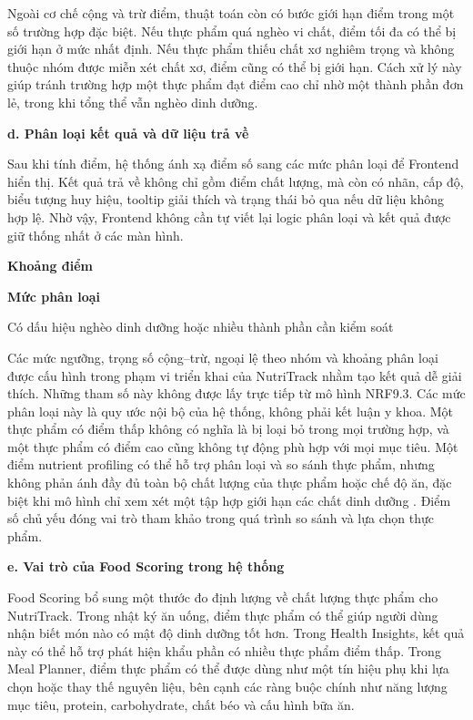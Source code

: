 \documentclass[12pt, a4paper]{report}
\begin{document}
Ngoài cơ chế cộng và trừ điểm, thuật toán còn có bước giới hạn điểm trong một số trường hợp đặc biệt. Nếu thực phẩm quá nghèo vi chất, điểm tối đa có thể bị giới hạn ở mức nhất định. Nếu thực phẩm thiếu chất xơ nghiêm trọng và không thuộc nhóm được miễn xét chất xơ, điểm cũng có thể bị giới hạn. Cách xử lý này giúp tránh trường hợp một thực phẩm đạt điểm cao chỉ nhờ một thành phần đơn lẻ, trong khi tổng thể vẫn nghèo dinh dưỡng.

\textbf{d. Phân loại kết quả và dữ liệu trả về}

Sau khi tính điểm, hệ thống ánh xạ điểm số sang các mức phân loại để Frontend hiển thị. Kết quả trả về không chỉ gồm điểm chất lượng, mà còn có nhãn, cấp độ, biểu tượng huy hiệu, tooltip giải thích và trạng thái bỏ qua nếu dữ liệu không hợp lệ. Nhờ vậy, Frontend không cần tự viết lại logic phân loại và kết quả được giữ thống nhất ở các màn hình.

\textbf{Khoảng điểm}

\textbf{Mức phân loại}

Có dấu hiệu nghèo dinh dưỡng hoặc nhiều thành phần cần kiểm soát

Các mức ngưỡng, trọng số cộng–trừ, ngoại lệ theo nhóm và khoảng phân loại được cấu hình trong phạm vi triển khai của NutriTrack nhằm tạo kết quả dễ giải thích. Những tham số này không được lấy trực tiếp từ mô hình NRF9.3. Các mức phân loại này là quy ước nội bộ của hệ thống, không phải kết luận y khoa. Một thực phẩm có điểm thấp không có nghĩa là bị loại bỏ trong mọi trường hợp, và một thực phẩm có điểm cao cũng không tự động phù hợp với mọi mục tiêu. Một điểm nutrient profiling có thể hỗ trợ phân loại và so sánh thực phẩm, nhưng không phản ánh đầy đủ toàn bộ chất lượng của thực phẩm hoặc chế độ ăn, đặc biệt khi mô hình chỉ xem xét một tập hợp giới hạn các chất dinh dưỡng \cite{drewnowski2019}. Điểm số chủ yếu đóng vai trò tham khảo trong quá trình so sánh và lựa chọn thực phẩm.

\textbf{e. Vai trò của Food Scoring trong hệ thống}

Food Scoring bổ sung một thước đo định lượng về chất lượng thực phẩm cho NutriTrack. Trong nhật ký ăn uống, điểm thực phẩm có thể giúp người dùng nhận biết món nào có mật độ dinh dưỡng tốt hơn. Trong Health Insights, kết quả này có thể hỗ trợ phát hiện khẩu phần có nhiều thực phẩm điểm thấp. Trong Meal Planner, điểm thực phẩm có thể được dùng như một tín hiệu phụ khi lựa chọn hoặc thay thế nguyên liệu, bên cạnh các ràng buộc chính như năng lượng mục tiêu, protein, carbohydrate, chất béo và cấu hình bữa ăn.
\end{document}
